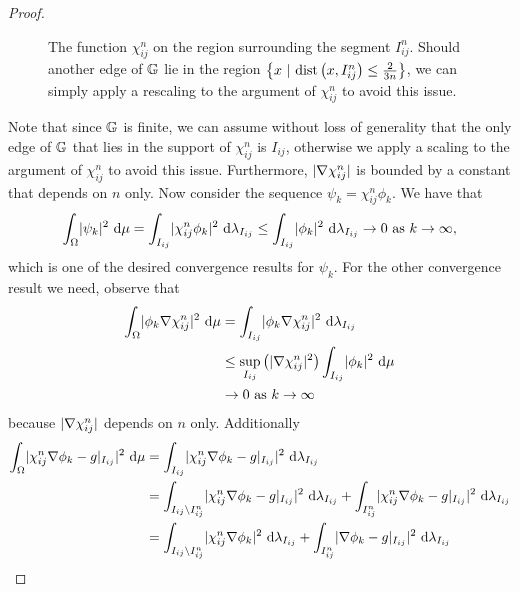 \begin{proof}
\begin{figure}
		\caption{\label{fig:chiDiagram} The function $\chi_{ij}^n$ on the region surrounding the segment $I_{ij}^n$. Should another edge of $\mathbb{G}$ lie in the region $\clbracs{x \ \vert \ \mathrm{dist}\bracs{x,I_{ij}^{n}}\leq\frac{2}{3n}}$, we can simply apply a rescaling to the argument of $\chi_{ij}^n$ to avoid this issue.}
	\end{figure}
	Note that since $\mathbb{G}$ is finite, we can assume without loss of generality that the only edge of $\mathbb{G}$ that lies in the support of $\chi_{ij}^n$ is $I_{ij}$, otherwise we apply a scaling to the argument of $\chi_{ij}^n$ to avoid this issue.
	Furthermore, $\lvert \nabla\chi_{ij}^{n} \rvert$ is bounded by a constant that depends on $n$ only.
	Now consider the sequence $\psi_k = \chi_{ij}^{n}\phi_k$.
	We have that
	\begin{align*}
		\int_{\Omega}\lvert \psi_k \rvert^2 \ \mathrm{d}\mu = \int_{I_{ij}}\lvert \chi_{ij}^{n}\phi_k \rvert^2 \ \mathrm{d}\lambda_{I_{ij}}
		\leq \int_{I_{ij}}\lvert \phi_k \rvert^2 \ \mathrm{d}\lambda_{I_{ij}} \rightarrow0 \ \text{as} \ k \rightarrow\infty,
	\end{align*}
	which is one of the desired convergence results for $\psi_k$.
	For the other convergence result we need, observe that
	\begin{align*}
		\int_{\Omega}\lvert \phi_k\nabla\chi_{ij}^{n} \rvert^2 \ \mathrm{d}\mu &= \int_{I_{ij}}\lvert \phi_k\nabla\chi_{ij}^{n} \rvert^2 \ \mathrm{d}\lambda_{I_{ij}} \\
		&\leq \sup_{I_{ij}}\left( \lvert \nabla\chi_{ij}^{n} \rvert^{2} \right)\int_{I_{ij}}\lvert \phi_{k} \rvert^{2} \ \mathrm{d}\mu \\
		&\rightarrow 0 \ \text{as} \ k \rightarrow\infty
	\end{align*}
	because $\lvert \nabla\chi_{ij}^{n} \rvert$ depends on $n$ only.
	Additionally
	\begin{align*}
		\integral{\ddom}{\abs{\chi_{ij}^n\grad\phi_k - g\vert_{I_{ij}}}^2}{\ddmes} &= \integral{I_{ij}}{\abs{\chi_{ij}^n\grad\phi_k - g\vert_{I_{ij}}}^2}{\lambda_{I_{ij}}} \\
		&= \integral{I_{ij}\setminus I_{ij}^n}{\abs{\chi_{ij}^n\grad\phi_k - g\vert_{I_{ij}}}^2}{\lambda_{I_{ij}}} + \integral{I_{ij}^n}{\abs{\chi_{ij}^n\grad\phi_k - g\vert_{I_{ij}}}^2}{\lambda_{I_{ij}}} \\
		&= \integral{I_{ij}\setminus I_{ij}^n}{\abs{\chi_{ij}^n\grad\phi_k}^2}{\lambda_{I_{ij}}} +  \integral{I_{ij}^n}{\abs{\grad\phi_k - g\vert_{I_{ij}}}^2}{\lambda_{I_{ij}}} \\

\end{align*}
\end{proof}
